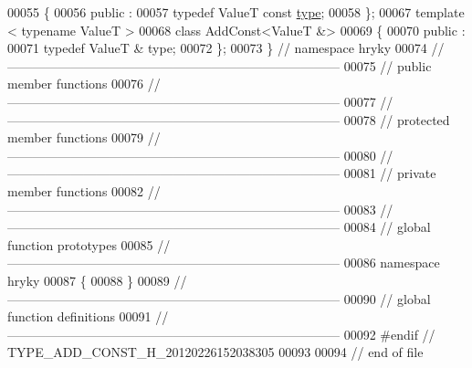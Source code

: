 \begin{DoxyCode}
00055 \{
00056 \textcolor{keyword}{public} :
00057     \textcolor{keyword}{typedef} ValueT \textcolor{keyword}{const}    \hyperlink{classhryky_1_1_add_const_adb29046fcfdac9d716cb5cb3c28d42ac}{type};
00058 \};
00067 \textcolor{keyword}{template} < \textcolor{keyword}{typename} ValueT >
00068 \textcolor{keyword}{class }AddConst<ValueT &>
00069 \{
00070 \textcolor{keyword}{public} :
00071     \textcolor{keyword}{typedef} ValueT &        type;
00072 \};
00073 \} \textcolor{comment}{// namespace hryky}
00074 \textcolor{comment}{//
      ------------------------------------------------------------------------------}
00075 \textcolor{comment}{// public member functions}
00076 \textcolor{comment}{//
      ------------------------------------------------------------------------------}
00077 \textcolor{comment}{//
      ------------------------------------------------------------------------------}
00078 \textcolor{comment}{// protected member functions}
00079 \textcolor{comment}{//
      ------------------------------------------------------------------------------}
00080 \textcolor{comment}{//
      ------------------------------------------------------------------------------}
00081 \textcolor{comment}{// private member functions}
00082 \textcolor{comment}{//
      ------------------------------------------------------------------------------}
00083 \textcolor{comment}{//
      ------------------------------------------------------------------------------}
00084 \textcolor{comment}{// global function prototypes}
00085 \textcolor{comment}{//
      ------------------------------------------------------------------------------}
00086 \textcolor{keyword}{namespace }hryky
00087 \{
00088 \} 
00089 \textcolor{comment}{//
      ------------------------------------------------------------------------------}
00090 \textcolor{comment}{// global function definitions}
00091 \textcolor{comment}{//
      ------------------------------------------------------------------------------}
00092 \textcolor{preprocessor}{#endif // TYPE\_ADD\_CONST\_H\_20120226152038305}
00093 \textcolor{preprocessor}{}
00094 \textcolor{comment}{// end of file}
\end{DoxyCode}
